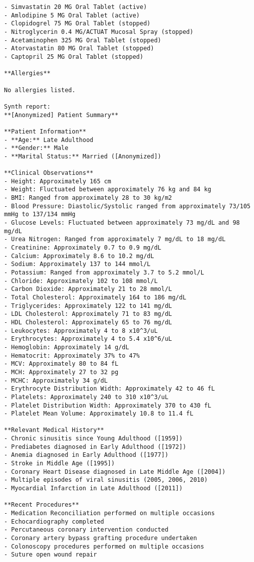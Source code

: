 \begin{lstlisting}
- Simvastatin 20 MG Oral Tablet (active)
- Amlodipine 5 MG Oral Tablet (active)
- Clopidogrel 75 MG Oral Tablet (stopped)
- Nitroglycerin 0.4 MG/ACTUAT Mucosal Spray (stopped)
- Acetaminophen 325 MG Oral Tablet (stopped)
- Atorvastatin 80 MG Oral Tablet (stopped)
- Captopril 25 MG Oral Tablet (stopped)

**Allergies**

No allergies listed.

Synth report:
**[Anonymized] Patient Summary**

**Patient Information**
- **Age:** Late Adulthood
- **Gender:** Male
- **Marital Status:** Married ([Anonymized])

**Clinical Observations**
- Height: Approximately 165 cm
- Weight: Fluctuated between approximately 76 kg and 84 kg
- BMI: Ranged from approximately 28 to 30 kg/m2
- Blood Pressure: Diastolic/Systolic ranged from approximately 73/105 mmHg to 137/134 mmHg
- Glucose Levels: Fluctuated between approximately 73 mg/dL and 98 mg/dL
- Urea Nitrogen: Ranged from approximately 7 mg/dL to 18 mg/dL
- Creatinine: Approximately 0.7 to 0.9 mg/dL
- Calcium: Approximately 8.6 to 10.2 mg/dL
- Sodium: Approximately 137 to 144 mmol/L
- Potassium: Ranged from approximately 3.7 to 5.2 mmol/L
- Chloride: Approximately 102 to 108 mmol/L
- Carbon Dioxide: Approximately 21 to 28 mmol/L
- Total Cholesterol: Approximately 164 to 186 mg/dL
- Triglycerides: Approximately 122 to 141 mg/dL
- LDL Cholesterol: Approximately 71 to 83 mg/dL
- HDL Cholesterol: Approximately 65 to 76 mg/dL
- Leukocytes: Approximately 4 to 8 x10^3/uL
- Erythrocytes: Approximately 4 to 5.4 x10^6/uL
- Hemoglobin: Approximately 14 g/dL
- Hematocrit: Approximately 37% to 47%
- MCV: Approximately 80 to 84 fL
- MCH: Approximately 27 to 32 pg
- MCHC: Approximately 34 g/dL
- Erythrocyte Distribution Width: Approximately 42 to 46 fL
- Platelets: Approximately 240 to 310 x10^3/uL
- Platelet Distribution Width: Approximately 370 to 430 fL
- Platelet Mean Volume: Approximately 10.8 to 11.4 fL

**Relevant Medical History**
- Chronic sinusitis since Young Adulthood ([1959])
- Prediabetes diagnosed in Early Adulthood ([1972])
- Anemia diagnosed in Early Adulthood ([1977])
- Stroke in Middle Age ([1995])
- Coronary Heart Disease diagnosed in Late Middle Age ([2004])
- Multiple episodes of viral sinusitis (2005, 2006, 2010)
- Myocardial Infarction in Late Adulthood ([2011])

**Recent Procedures**
- Medication Reconciliation performed on multiple occasions
- Echocardiography completed
- Percutaneous coronary intervention conducted
- Coronary artery bypass grafting procedure undertaken
- Colonoscopy procedures performed on multiple occasions
- Suture open wound repair


\end{lstlisting}
